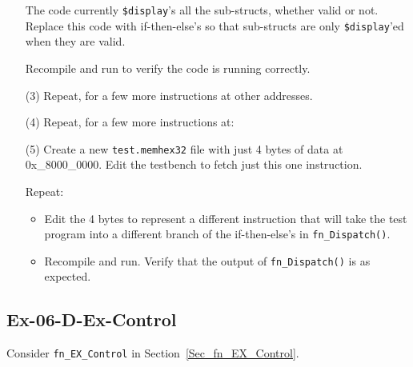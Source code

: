 \begin{itemize}
    The code currently \verb|$display|'s all the sub-structs, whether
    valid or not.  Replace this code with if-then-else's so that
    sub-structs are only \verb|$display|'ed when they are valid.

    Recompile and run to verify the code is running correctly.

\item[(3)] Repeat, for a few more instructions at other addresses.

\item[(4)] Repeat, for a few more instructions at:

\item[(5)] Create a new \verb|test.memhex32| file with just 4 bytes of
    data at 0x\_8000\_0000.  Edit the testbench to fetch just this one
    instruction.

    Repeat:
    \begin{itemize}

    \item Edit the 4 bytes to represent a different instruction that
      will take the test program into a different branch of the
      if-then-else's in \verb|fn_Dispatch()|.

    \item Recompile and run. Verify that the output of
          \verb|fn_Dispatch()| is as expected.

    \end{itemize}

\end{itemize}


\subsection*{Ex-06-D-Ex-Control}
\label{Ex-06-D-Ex-Control}

Consider {\tt fn\_EX\_Control} in Section~\ref{Sec_fn_EX_Control}.

